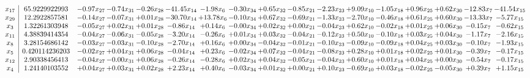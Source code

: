 \documentclass[9pt]{article}
\begin{document}
 \[\begin{array}{c| c c@{\hskip 2pt} c@{\hskip 2pt} c@{\hskip 2pt} c@{\hskip 2pt} c@{\hskip 2pt} c@{\hskip 2pt} c@{\hskip 2pt} c@{\hskip 2pt} c@{\hskip 2pt} c@{\hskip 2pt} c@{\hskip 2pt} c@{\hskip 2pt} c@{\hskip 2pt} c@{\hskip 2pt} c@{\hskip 2pt} }
 x_{17}   &  65.9229922993 & -0.97 x_{27} & -0.74 x_{31} & -0.26 x_{28} & -41.45 x_{14} & -1.98 x_{6} & -0.30 x_{34} & +  0.65 x_{32} & -0.85 x_{21} & -2.23 x_{23} & +  9.09 x_{10} & -1.05 x_{18} & +  0.96 x_{25} & +  0.62 x_{30} & -12.83 x_{7} & -41.54 x_{15}\\
 x_{29}   &  12.2922857581 & -0.14 x_{27} & -0.07 x_{31} & +  0.01 x_{28} & -30.70 x_{14} & + 13.78 x_{6} & -0.10 x_{34} & +  0.67 x_{32} & -0.69 x_{21} & -1.33 x_{23} & -2.70 x_{10} & -0.46 x_{18} & +  0.61 x_{25} & +  0.60 x_{30} & -13.33 x_{7} & -5.77 x_{15}\\
 x_{3}   &  1.32261303948 & -0.05 x_{27} & +  0.02 x_{31} & +  0.01 x_{28} & -0.86 x_{14} & +  0.14 x_{6} & -0.00 x_{34} & +  0.02 x_{32} & +  0.00 x_{21} & -0.04 x_{23} & +  0.62 x_{10} & -0.02 x_{18} & +  0.01 x_{25} & +  0.06 x_{30} & -0.15 x_{7} & -0.62 x_{15}\\
 x_{11}   &  4.38839414354 & -0.04 x_{27} & -0.06 x_{31} & -0.05 x_{28} & -3.20 x_{14} & -0.26 x_{6} & +  0.01 x_{34} & +  0.03 x_{32} & -0.04 x_{21} & -0.12 x_{23} & +  0.50 x_{10} & -0.10 x_{18} & +  0.03 x_{25} & +  0.04 x_{30} & -1.17 x_{7} & -2.16 x_{15}\\
 x_{8}   &  3.28154686142 & -0.03 x_{27} & -0.03 x_{31} & -0.10 x_{28} & -2.70 x_{14} & +  0.16 x_{6} & +  0.00 x_{34} & -0.04 x_{32} & -0.01 x_{21} & -0.10 x_{23} & -0.09 x_{10} & -0.09 x_{18} & +  0.04 x_{25} & +  0.03 x_{30} & -0.10 x_{7} & -1.93 x_{15}\\
 x_{5}   &  0.420114236203 & -0.02 x_{27} & +  0.04 x_{31} & +  0.06 x_{28} & -0.04 x_{14} & +  0.23 x_{6} & -0.02 x_{34} & +  0.07 x_{32} & -0.04 x_{21} & -0.08 x_{23} & +  0.28 x_{10} & +  0.01 x_{18} & +  0.02 x_{25} & +  0.01 x_{30} & -0.39 x_{7} & -0.17 x_{15}\\
 x_{12}   &  2.90338456413 & -0.04 x_{27} & -0.00 x_{31} & +  0.06 x_{28} & -0.26 x_{14} & -0.28 x_{6} & +  0.02 x_{34} & +  0.04 x_{32} & -0.05 x_{21} & -0.04 x_{23} & +  0.60 x_{10} & +  0.01 x_{18} & +  0.04 x_{25} & +  0.00 x_{30} & -0.54 x_{7} & -0.17 x_{15}\\
 x_{4}   &  1.24140103552 & +  0.04 x_{27} & +  0.03 x_{31} & +  0.02 x_{28} & +  2.23 x_{14} & +  0.40 x_{6} & -0.03 x_{34} & +  0.01 x_{32} & +  0.00 x_{21} & +  0.10 x_{23} & -0.69 x_{10} & +  0.03 x_{18} & -0.02 x_{25} & -0.05 x_{30} & +  0.39 x_{7} & +  1.15 x_{15}\\

\end{array}\]
\end{document}
